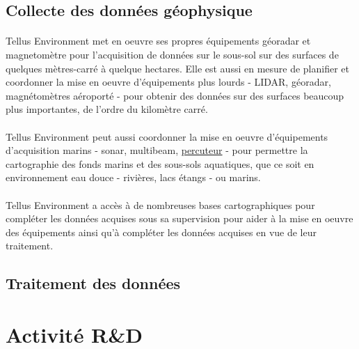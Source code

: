 \documentclass[12pt,a4paper]{report}
\begin{document}
	\subsection{Collecte des données géophysique}
	
	\paragraph*{} Tellus Environment met en oeuvre ses propres équipements géoradar et magnetomètre pour l'acquisition de données sur le sous-sol sur des surfaces de quelques mètres-carré à quelque hectares. Elle est aussi en mesure de planifier et coordonner la mise en oeuvre d'équipements plus lourds - LIDAR, géoradar, magnétomètres aéroporté - pour obtenir des données sur des surfaces beaucoup plus importantes, de l'ordre du kilomètre carré.
	
	
	\paragraph*{} Tellus Environment peut aussi coordonner la mise en oeuvre d'équipements d'acquisition marins - sonar, multibeam, \underline{percuteur}  - pour permettre la cartographie des fonds marins et des sous-sols aquatiques, que ce soit en environnement eau douce - rivières, lacs étangs - ou marins. 
	
	\paragraph*{} Tellus Environment a accès à de nombreuses bases cartographiques pour compléter les données acquises sous sa supervision pour aider à la mise en oeuvre des équipements ainsi qu'à compléter les données acquises en vue de leur traitement.

	\subsection{Traitement des données}

	\section{Activité R\&D}
	
\end{document}
